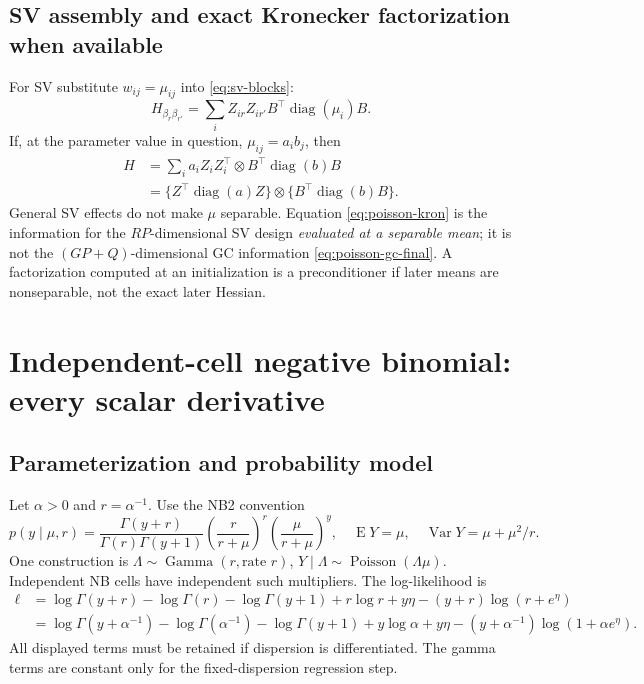 \documentclass[11pt,a4paper]{article}
\newcommand{\E}{\operatorname{E}}
\newcommand{\Var}{\operatorname{Var}}
\newcommand{\diag}{\operatorname{diag}}
\numberwithin{equation}{section}
\begin{document}
\subsection{SV assembly and exact Kronecker factorization when available}
For SV substitute $w_{ij}=\mu_{ij}$ into \eqref{eq:sv-blocks}:
\[
 H_{\beta_r\beta_{r'}}
 =\sum_iZ_{ir}Z_{ir'}B^\top\diag(\mu_i)B.
\]
If, at the parameter value in question, $\mu_{ij}=a_i b_j$,
then
\begin{align}
 H&=\sum_i a_i Z_iZ_i^\top\otimes B^\top\diag(b)B\\
  &=\{Z^\top\diag(a)Z\}\otimes\{B^\top\diag(b)B\}.
 \label{eq:poisson-kron}
\end{align}
General SV effects do not make $\mu$ separable.
Equation \eqref{eq:poisson-kron} is the information for the $RP$-dimensional
SV design \emph{evaluated at a separable mean}; it is not the
$(GP+Q)$-dimensional GC information \eqref{eq:poisson-gc-final}.
A factorization computed at an initialization is a preconditioner if
later means are nonseparable, not the exact later Hessian.

\section{Independent-cell negative binomial: every scalar derivative}
\label{sec:independent-nb}

\subsection{Parameterization and probability model}
Let $\alpha>0$ and $r=\alpha^{-1}$. Use the NB2 convention
\begin{equation}
 p(y\mid\mu,r)=
 \frac{\Gamma(y+r)}{\Gamma(r)\Gamma(y+1)}
 \left(\frac{r}{r+\mu}\right)^r
 \left(\frac{\mu}{r+\mu}\right)^y,
 \quad \E Y=\mu,\quad \Var Y=\mu+\mu^2/r.
\end{equation}
One construction is $\Lambda\sim\operatorname{Gamma}(r,\text{rate }r)$,
$Y\mid\Lambda\sim\operatorname{Poisson}(\Lambda\mu)$.
Independent NB cells have independent such multipliers.
The log-likelihood is
\begin{align}
 \ell
 &=\log\Gamma(y+r)-\log\Gamma(r)-\log\Gamma(y+1)
     +r\log r+y\eta-(y+r)\log(r+e^\eta)\\
 &=\log\Gamma(y+\alpha^{-1})-\log\Gamma(\alpha^{-1})
       -\log\Gamma(y+1)+y\log\alpha+y\eta
       -(y+\alpha^{-1})\log(1+\alpha e^\eta).
 \label{eq:nb-ll-full}
\end{align}
All displayed terms must be retained if dispersion is differentiated.
The gamma terms are constant only for the fixed-dispersion regression step.
\end{document}
